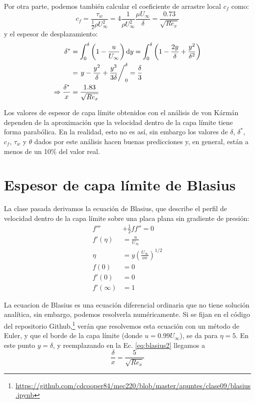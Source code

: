 Por otra parte, podemos también calcular el coeficiente de arrastre local $c_f$ como:
%
\begin{equation}\label{eq:cf_vk}
c_f = \frac{\tau_w}{\frac{1}{2}\rho U_\infty^2} = 4\frac{1}{\rho U_\infty^2}\frac{\mu U_\infty}{\delta} = \frac{0.73}{\sqrt{Re_x}}
\end{equation}
%
y el espesor de desplazamiento:
%
\begin{align}\label{eq:desplazamiento_vk}
\delta^* &= \int_0^\delta\left(1-\frac{u}{U_\infty}\right)\mathrm{d}y = \int_0^\delta \left(1-\frac{2y}{\delta}+\frac{y^2}{\delta^2}\right)\nonumber\\
&= \left. y-\frac{y^2}{\delta}+\frac{y^3}{3\delta}\right/_0^\delta = \frac{\delta}{3}\nonumber\\
\Rightarrow \frac{\delta^*}{x} &= \frac{1.83}{\sqrt{Re_x}}
\end{align}

Los valores de espesor de capa límite obtenidos con el análisis de von Kármán dependen de la aproximación que la velocidad dentro de la capa límite tiene forma parabólica. 
En la realidad, esto no es así, sin embargo los valores de $\delta$, $\delta^*$, $c_f$, $\tau_w$ y $\theta$ dados por este análisis hacen buenas predicciones y, en general, están a menos de un 10\% del valor real.

\section*{Espesor de capa límite de Blasius}

 La clase pasada derivamos la ecuación de Blasius, que describe el perfil de velocidad dentro de la capa límite sobre una placa plana sin gradiente de presión:
 \begin{align}\label{eq:blasius2}
f'''&+\frac{1}{2}ff''=0\nonumber\\
f'(\eta) &= \frac{u}{U_\infty} \nonumber\\
\eta &= y\left(\frac{U_\infty}{\nu x}\right)^{1/2}\nonumber\\
f(0) &= 0\nonumber\\
f'(0) &= 0\nonumber\\
f'(\infty) &= 1
 \end{align}

 La ecuacion de Blasius es una ecuación diferencial ordinaria que no tiene solución analítica, sin embargo, podemos resolverla numéricamente.
 Si se fijan en el código del repositorio Github,\footnote{\url{https://github.com/cdcooper84/mec220/blob/master/apuntes/clase09/blasius.ipynb}} verán  que resolvemos esta ecuación con un método de Euler, y que el borde de la capa límite (donde $u=0.99U_\infty$), se da para $\eta=5$.
En este punto $y=\delta$, y reemplazando en la Ec. \eqref{eq:blasius2} llegamos a
%
\begin{equation}\label{eq:delta_blasius}
\frac{\delta}{x} = \frac{5}{\sqrt{Re_x}}
\end{equation}


